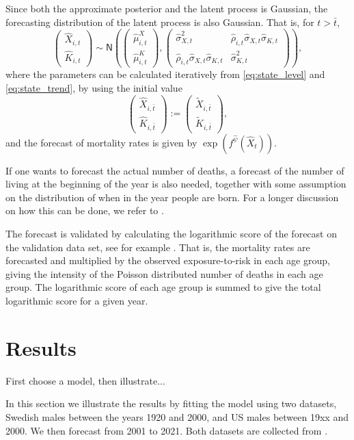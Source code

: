 \documentclass[preprint,12pt]{elsarticle}
\newcommand{\m}[1]{\begin{pmatrix}
#1
\end{pmatrix}}
\newcommand{\pa}[1]{\left(#1\right)}
\begin{document}
Since both the approximate posterior and the latent process is Gaussian, the forecasting distribution of the latent process is also Gaussian. That is, for $t>\bar t$,
\begin{equation}
\m{
\hat X_{i,t}\\ \hat K_{i,t}} 
\sim \mathsf N\pa{
\m{\hat\mu^X_{i,t}\\
\hat\mu^K_{i,t}}
,
\m{
\hat \sigma^2_{X,t} & \hat\rho_{i,t}\hat \sigma_{X,t}\hat \sigma_{K,t}\\
 \hat\rho_{i,t}\hat \sigma_{X,t}\hat \sigma_{K,t} & \hat \sigma^2_{K,t}
}
},
\end{equation}
where the parameters can be calculated iteratively from \eqref{eq:state_level} and \eqref{eq:state_trend}, by using the initial value
\begin{equation}
	\m{
\hat X_{i,\bar t}\\ \hat K_{i,\bar t}}:=  	\m{
\tilde X_{i,\bar t}\\ \tilde K_{i,\bar t}},
\end{equation}
and  the forecast of mortality rates is given by $\exp(f^{\hat \psi}(\hat X_t))$.

If one wants to forecast the actual number of deaths, a forecast of the number of living at the beginning of the year is also needed, together with some assumption on the distribution of when in the year people are born. For a longer discussion on how this can be done, we refer to \cite{andersson2020mortality}.

The forecast is validated by calculating the logarithmic score of the forecast on the validation data set, see for example \cite{gneiting2007strictly}. That is, the mortality rates are forecasted and multiplied by the observed exposure-to-risk in each age group, giving the intensity of the Poisson distributed number of deaths in each age group. The logarithmic score of each age group is summed to give the total logarithmic score for a given year.

\section{Results}\label{sec:results}
First choose a model, then illustrate...


In this section we illustrate the results by fitting the model using two datasets, Swedish males between the years 1920 and 2000, and US males between 19xx and 2000. We then forecast from 2001 to 2021. Both datasets are collected from \cite{hmd2018data}.
\end{document}
